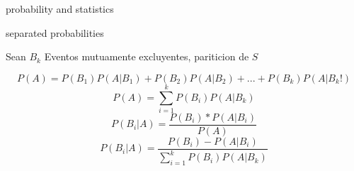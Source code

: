 \begin{section}{probability and statistics}
\begin{subsection}{separated probabilities}
\begin{center}
	Sean $B_k$ Eventos mutuamente excluyentes, pariticion de $S$

	\end{center}
	$$P(A) = P(B_1)P(A|B_1) + P(B_2)P(A|B_2) + ... + P(B_k)P(A|B_k!)$$
	$$P(A) = \sum_{i=1}^{k}P(B_i)P(A|B_k)$$
	$$P(B_i|A) = \frac{ P(B_i)*P(A|B_i) }{ P(A) } $$
	$$P(B_i|A) = \frac{P(B_i) - P(A|B_i)}{\sum\limits_{i=1}^{k}P(B_i)P(A|B_k)}$$
	\end{subsection}




\end{section}
